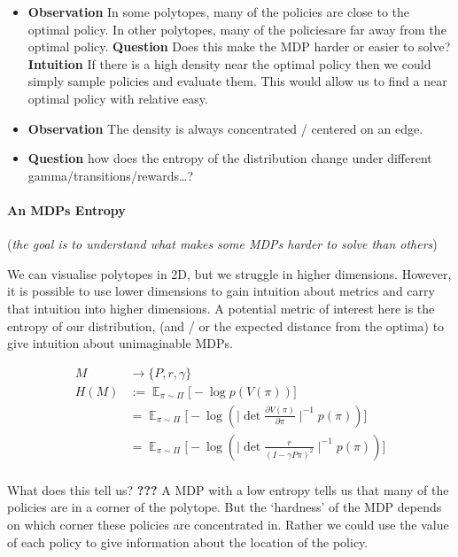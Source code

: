\begin{itemize}
\item
  \textbf{Observation} In some polytopes, many of the policies are close
  to the optimal policy. In other polytopes, many of the policiesare far
  away from the optimal policy. \textbf{Question} Does this make the MDP
  harder or easier to solve? \textbf{Intuition} If there is a high
  density near the optimal policy then we could simply sample policies
  and evaluate them. This would allow us to find a near optimal policy
  with relative easy.
\item
  \textbf{Observation} The density is always concentrated / centered on
  an edge.
\item
  \textbf{Question} how does the entropy of the distribution change
  under different gamma/transitions/rewards\ldots{}?
\end{itemize}

\paragraph{An MDPs Entropy}

(\emph{the goal is to understand what makes some MDPs harder to solve
than others})

We can visualise polytopes in 2D, but we struggle in higher dimensions.
However, it is possible to use lower dimensions to gain intuition about
metrics and carry that intuition into higher dimensions. A potential
metric of interest here is the entropy of our distribution, (and / or
the expected distance from the optima) to give intuition about
unimaginable MDPs.

\begin{align}
M &\to \{P, r, \gamma\} \tag{a MDP}\\
H(M) &:= \mathop{\mathbb E}_{\pi\sim\Pi}\Big[-\log p(V(\pi)) \Big]\\
&= \mathop{\mathbb E}_{\pi\sim\Pi}\Big[-\log(\mid \det\frac{\partial V(\pi)}{\partial \pi}\mid^{-1}p(\pi)) \Big] \\
&= \mathop{\mathbb E}_{\pi\sim\Pi}\Big[-\log(\mid \det \frac{r}{(I-\gamma P \pi)^2}\mid^{-1}p(\pi)) \Big] \\
\end{align}

What does this tell us? \textbf{???} A MDP with a low entropy tells us
that many of the policies are in a corner of the polytope. But the
`hardness' of the MDP depends on which corner these policies are
concentrated in. Rather we could use the value of each policy to give
information about the location of the policy.

